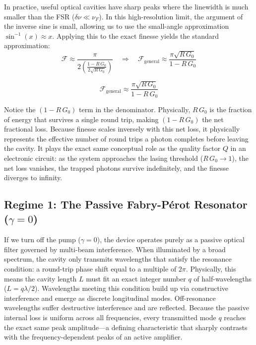 In practice, useful optical cavities have sharp peaks where the linewidth is much smaller than the FSR ($\delta\nu \ll \nu_F$). In this high-resolution limit, the argument of the inverse sine is small, allowing us to use the small-angle approximation $\sin^{-1}(x) \approx x$. Applying this to the exact finesse yields the standard approximation:
\begin{equation*}
    \mathcal{F} \approx \frac{\pi}{2 \left( \frac{1 - R\,G_0}{2\sqrt{R\,G_0}} \right)} \quad \Rightarrow \quad \mathcal{F}_{\text{general}} \approx \frac{\pi\sqrt{R\,G_0}}{1 - R\,G_0}
\end{equation*}

\begin{keyresult}
    \begin{equation}
        \mathcal{F}_{\text{general}} \approx \frac{\pi\sqrt{R\,G_0}}{1 - R\,G_0}
    \end{equation}
\end{keyresult}

Notice the $(1 - R\,G_0)$ term in the denominator. Physically, $R\,G_0$ is the fraction of energy that survives a single round trip, making $(1 - R\,G_0)$ the net fractional loss. Because finesse scales inversely with this net loss, it physically represents the effective number of round trips a photon completes before leaving the cavity. It plays the exact same conceptual role as the quality factor $Q$ in an electronic circuit: as the system approaches the lasing threshold ($R\,G_0 \to 1$), the net loss vanishes, the trapped photons survive indefinitely, and the finesse diverges to infinity.

\subsection{Regime 1: The Passive Fabry-P\'{e}rot Resonator (\texorpdfstring{$\gamma = 0$}{gamma = 0})}

If we turn off the pump ($\gamma = 0$), the device operates purely as a passive optical filter governed by multi-beam interference. When illuminated by a broad spectrum, the cavity only transmits wavelengths that satisfy the resonance condition: a round-trip phase shift equal to a multiple of $2\pi$. Physically, this means the cavity length $L$ must fit an exact integer number $q$ of half-wavelengths ($L = q\lambda/2$). Wavelengths meeting this condition build up via constructive interference and emerge as discrete longitudinal modes. Off-resonance wavelengths suffer destructive interference and are reflected. Because the passive internal loss is uniform across all frequencies, every transmitted mode $q$ reaches the exact same peak amplitude---a defining characteristic that sharply contrasts with the frequency-dependent peaks of an active amplifier.

